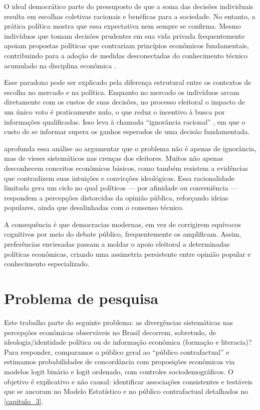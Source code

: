 O ideal democrático parte do pressuposto de que a soma das decisões individuais resulta em escolhas coletivas racionais e benéficas para a sociedade. No entanto, a prática política mostra que essa expectativa nem sempre se confirma. Mesmo indivíduos que tomam decisões prudentes em sua vida privada frequentemente apoiam propostas políticas que contrariam princípios econômicos fundamentais, contribuindo para a adoção de medidas desconectadas do conhecimento técnico acumulado na disciplina econômica \cite{downs1957economic,The_Myth_of_the_Rational_Voter}.

Esse paradoxo pode ser explicado pela diferença estrutural entre os contextos de escolha no mercado e na política. Enquanto no mercado os indivíduos arcam diretamente com os custos de suas decisões, no processo eleitoral o impacto de um único voto é praticamente nulo, o que reduz o incentivo à busca por informações qualificadas. Isso leva à chamada “ignorância racional” \cite{downs1957economic}, em que o custo de se informar supera os ganhos esperados de uma decisão fundamentada.

 aprofunda essa análise ao argumentar que o problema não é apenas de ignorância, mas de vieses sistemáticos nas crenças dos eleitores. Muitos não apenas desconhecem conceitos econômicos básicos, como também resistem a evidências que contradizem suas intuições e convicções ideológicas. Essa racionalidade limitada gera um ciclo no qual políticos — por afinidade ou conveniência — respondem a percepções distorcidas da opinião pública, reforçando ideias populares, ainda que desalinhadas com o consenso técnico.

A consequência é que democracias modernas, em vez de corrigirem equívocos cognitivos por meio do debate público, frequentemente os amplificam. Assim, preferências enviesadas passam a moldar o apoio eleitoral a determinadas políticas econômicas, criando uma assimetria persistente entre opinião popular e conhecimento especializado.

\section{Problema de pesquisa}
Este trabalho parte do seguinte problema: as divergências sistemáticas nas percepções econômicas observáveis no Brasil decorrem, sobretudo, de ideologia/identidade política ou de informação econômica (formação e literacia)? Para responder, comparamos o público geral ao “público contrafactual” e estimamos probabilidades de concordância com proposições econômicas via modelos logit binário e logit ordenado, com controles sociodemográficos. O objetivo é explicativo e não causal: identificar associações consistentes e testáveis que se ancoram no Modelo Estatístico e no público contrafactual detalhados no \autoref{capitulo_3}.


